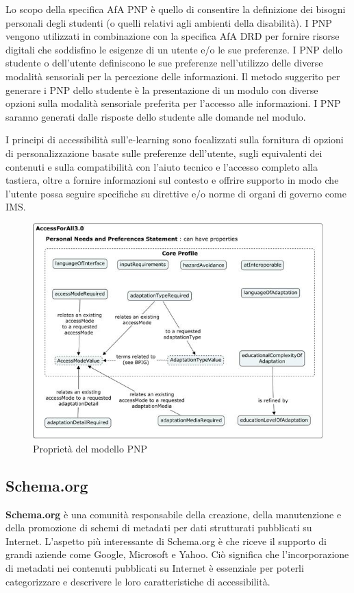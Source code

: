 Lo scopo della specifica AfA PNP è quello di consentire la definizione dei bisogni personali degli studenti (o quelli relativi agli ambienti della disabilità). I PNP vengono utilizzati in combinazione con la specifica AfA DRD per fornire risorse digitali che soddisfino le esigenze di un utente e/o le sue preferenze. I PNP dello studente o dell'utente definiscono le sue preferenze nell'utilizzo delle diverse modalità sensoriali per la percezione delle informazioni. Il metodo suggerito per generare i PNP dello studente è la presentazione di un modulo con diverse opzioni sulla modalità sensoriale preferita per l'accesso alle informazioni. I PNP saranno generati dalle risposte dello studente alle domande nel modulo.

I principi di accessibilità sull'e-learning sono focalizzati sulla fornitura di opzioni di personalizzazione basate sulle preferenze dell'utente, sugli equivalenti dei contenuti e sulla compatibilità con l'aiuto tecnico e l'accesso completo alla tastiera, oltre a fornire informazioni sul contesto e offrire supporto in modo che l'utente possa seguire specifiche su direttive e/o norme di organi di governo come IMS.

\begin{figure}[H]
\centering
\includegraphics[scale=0.7]{res/pnp.png}
\caption{Proprietà del modello PNP}
\label{fig:pnp}
\end{figure}

\subsection{Schema.org}
\textbf{Schema.org} è una comunità responsabile della creazione, della manutenzione e della promozione di schemi di metadati per dati strutturati pubblicati su Internet. L'aspetto più interessante di Schema.org è che riceve il supporto di grandi aziende come Google, Microsoft e Yahoo. Ciò significa che l'incorporazione di metadati nei contenuti pubblicati su Internet è essenziale per poterli categorizzare e descrivere le loro caratteristiche di accessibilità.


